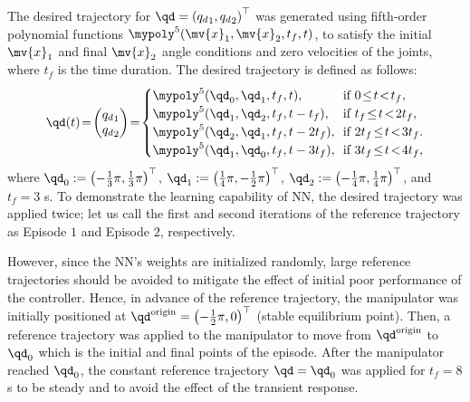 \documentclass[lettersize,journal]{IEEEtran}
\begin{document}
The desired trajectory for $\qd=\left({q_d}_1,{q_d}_2\right)^\top $ was generated using fifth-order polynomial functions $\mypoly^5(\mv{x}_1,\mv{x}_2,t_f,t)$, to satisfy the initial $\mv{x}_1$ and final $\mv{x}_2$ angle conditions and zero velocities of the joints, where $t_f$ is the time duration.
The desired trajectory is defined as follows:
\begin{equation}
    \qd(t) 
    \!=\! 
    \begin{pmatrix}
        {q_d}_1\\{q_d}_2
    \end{pmatrix}
    \!=\!
    \begin{cases}
    \mypoly^5({\qd}_0,{\qd}_1,t_f,t),
        \!&\!
        \text{if } 0\!\le\!t\!<\!t_f 
        ,
        \\
    \mypoly^5({\qd}_1,{\qd}_2,t_f,t-t_f),
        \!&\!
        \text{if } t_f\!\le\!t\!<\!2t_f 
        ,
        \\
    \mypoly^5({\qd}_2,{\qd}_1,t_f,t-2t_f),
        \!&\! 
        \text{if } 2t_f\!\le\!t\!<\!3t_f 
        .
        \\
    \mypoly^5({\qd}_1,{\qd}_0,t_f,t-3t_f),
        \!&\!    
        \text{if } 3t_f\!\le\!t\!<\!4t_f 
        ,
        \\
    \end{cases}
    \label{eq:desired trajectory}
\end{equation}
where ${\qd}_0:=\left(-\tfrac{1}{3}\pi,\tfrac{1}{3}\pi\right)^\top$, ${\qd}_1:=\left(\tfrac{1}{4}\pi,-\tfrac{1}{2}\pi\right)^\top$, ${\qd}_2:=\left(-\tfrac{1}{4}\pi,\tfrac{1}{4}\pi\right)^\top$, and $t_f=3$ s.
To demonstrate the learning capability of NN, the desired trajectory was applied twice; let us call the first and second iterations of the reference trajectory as Episode $1$ and Episode $2$, respectively.

However, since the NN's weights are initialized randomly, large reference trajectories should be avoided to mitigate the effect of initial poor performance of the controller.
Hence, in advance of the reference trajectory, the manipulator was initially positioned at ${\qd}^{\rm{origin}}=\left(-\tfrac{1}{2}\pi,0\right)^\top$ (\ie stable equilibrium point).
Then, a reference trajectory was applied to the manipulator to move from ${\qd}^{\rm{origin}}$ to ${\qd}_0$ which is the initial and final points of the episode.
After the manipulator reached ${\qd}_0$, the constant reference trajectory $\qd={\qd}_0$ was applied for $t_f=8$ s to be steady and to avoid the effect of the transient response.
\end{document}
